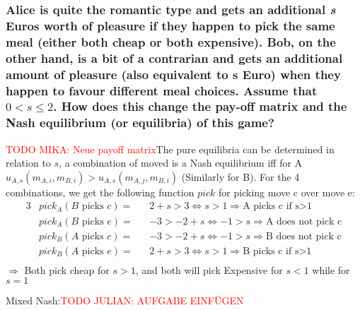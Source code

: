     \subsubsection{Alice is quite the romantic type and gets an additional \textit{s} Euros worth of pleasure if they happen to pick the same meal (either both cheap or both expensive). Bob, on the other hand, is a bit of a contrarian and gets an additional amount of pleasure (also equivalent to \textbf{s} Euro) when they happen to favour different meal choices. Assume that $ 0 < s \leq 2 $. How does this change the pay-off matrix and the Nash equilibrium (or equilibria) of this game?}
    \textcolor{red}{TODO MIKA: Neue payoff matrix}The pure equilibria can be determined in relation to $s$, a combination of moved is a Nash equilibrium iff for A $u_{A,s}(m_{A,i}, m_{B,i})>u_{A,s}(m_{A,j}, m_{B,i})$ (Similarly for B).
        For the 4 combinations, we get the following function $pick$ for picking move c over move e:
        \begin{alignat*}{3}
            &pick_A(B \text{ picks } c)=&& 2+s>3 \Leftrightarrow s>1 \Rightarrow \text{A picks c if s>1}\\
            &pick_A(B \text{ picks } e)=&& -3>-2+s \Leftrightarrow -1>s \Rightarrow \text{A does not pick c}\\
            &pick_B(A \text{ picks } c)=&& -3>-2+s \Leftrightarrow -1>s \Rightarrow \text{B does not pick c}\\
            &pick_B(A \text{ picks } e)=&& 2+s>3 \Leftrightarrow s>1 \Rightarrow \text{B picks c if s>1}\\
        \end{alignat*}
        $\Rightarrow$ Both pick cheap for $s>1$, and both will pick Expensive for $s<1$ while for $s=1$
        \par Mixed Nash:\textcolor{red}{TODO JULIAN: AUFGABE EINFÜGEN}

   
